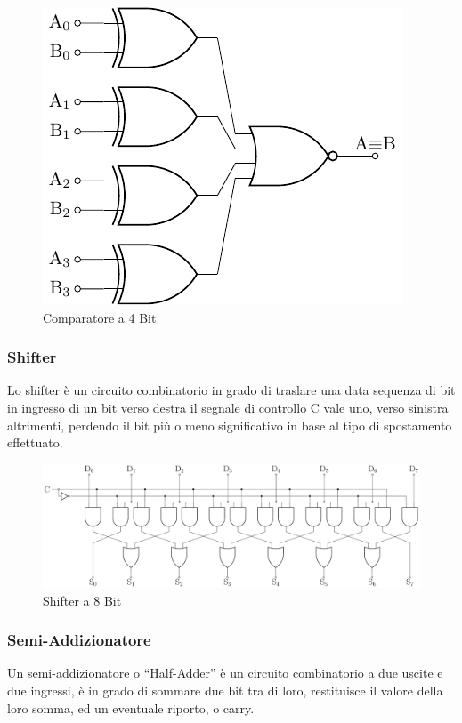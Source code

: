 \documentclass{article}
\numberwithin{equation}{subsection}
\begin{document}
\begin{figure}[H]%
    \centering%
    \includegraphics{comparatore-4-bit.pdf}%
    \caption{Comparatore a 4 Bit}%
\end{figure}

\subsubsection{Shifter}

Lo shifter è un circuito combinatorio in grado di traslare una data sequenza di bit in ingresso di un bit verso destra il segnale di controllo C vale uno, verso sinistra altrimenti, perdendo il bit più o meno 
significativo in base al tipo di spostamento effettuato. 
\begin{figure}[H]%
    \centering%
    \includegraphics[scale=0.55]{shifter-8-bit.pdf}%
    \caption{Shifter a 8 Bit}%
\end{figure}

\subsubsection{Semi-Addizionatore}

Un semi-addizionatore o ``Half-Adder'' è un circuito combinatorio a due uscite e due ingressi, è in grado di sommare due bit tra di loro, restituisce il valore della loro somma, ed un eventuale riporto, o carry. 
\end{document}
